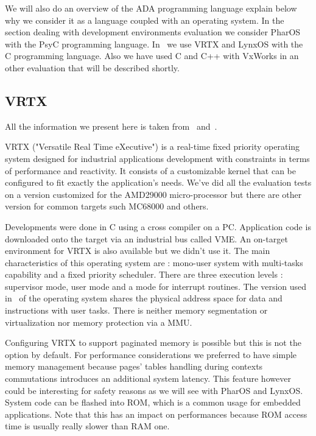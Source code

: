 \documentclass[10pt]{report}
\begin{document}
We will also do an overview of the ADA programming language 
explain below why we consider it as a language coupled with an 
operating system. In the section dealing with development 
environments evaluation we consider PharOS with the PsyC 
programming language. In~\cite{Delchini:95} we use VRTX and LynxOS 
with the C programming language. Also we have used C and C++ with 
VxWorks in an other evaluation that will be described shortly.

\subsection{VRTX}

All the information we present here is taken from~\cite{VRTX:90} and~\cite{AMD29000:91}.

VRTX ("Versatile Real Time eXecutive") is a real-time fixed 
priority operating system designed for industrial applications 
development with constraints in terms of performance and 
reactivity. It consists of a customizable kernel that can be 
configured to fit exactly the application's needs. We've did all 
the evaluation tests on a version customized for the AMD29000 
micro-processor but there are other version for common targets 
such MC68000 and others.

Developments were done in C using a cross compiler on a PC. 
Application code is downloaded onto the target via an industrial 
bus called VME. An on-target environment for VRTX is also 
available but we didn't use it. The main characteristics of this 
operating system are : mono-user system with multi-tasks 
capability and a fixed priority scheduler. There are three 
execution levels : supervisor mode, user mode and a mode for 
interrupt routines. The version used in~\cite{Delchini:95} of the 
operating system shares the physical address space for data and 
instructions with user tasks. There is neither memory 
segmentation or virtualization nor memory protection via a MMU.

Configuring VRTX to support paginated memory is possible but this 
is not the option by default. For performance considerations we 
preferred to have simple memory management because pages' tables 
handling during contexts commutations introduces an additional 
system latency. This feature however could be interesting for 
safety reasons as we will see with PharOS and LynxOS. System code 
can be flashed into ROM, which is a common usage for embedded 
applications. Note that this has an impact on performances 
because ROM access time is usually really slower than RAM one.
\end{document}
